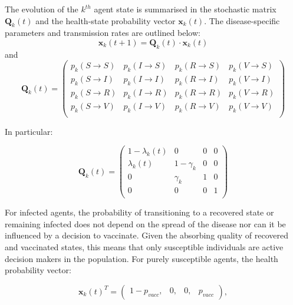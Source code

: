 \documentclass[11pt]{article}
\begin{document}
The evolution of the $\mathit{k}^{th}$ agent state is summarised in the stochastic matrix \(\mathbf{Q}_k(t)\) and the health-state probability vector \(\mathbf{x}_k(t)\). The disease-specific parameters and transmission rates are outlined below:
\begin{equation}\label{eq:1}
	 \mathbf{x}_k(t+1) = \mathbf{Q}_k(t) \cdot \mathbf{x}_k(t)
\end{equation}
and 
\begin{equation}\label{eq:2}
	 \mathbf{Q}_k(t) = 
	 \left (\begin{array}{cccc} p_{k}(S\rightarrow{}S)&p_{k}(I\rightarrow{}S)&p_{k}(R\rightarrow{}S)&p_{k}(V\rightarrow{}S) \\
	 	p_{k}(S\rightarrow{}I)&p_{k}(I\rightarrow{}I)&p_{k}(R\rightarrow{}I)&p_{k}(V\rightarrow{}I) \\
		p_{k}(S\rightarrow{}R)&p_{k}(I\rightarrow{}R)&p_{k}(R\rightarrow{}R)&p_{k}(V\rightarrow{}R) \\
		p_{k}(S\rightarrow{}V)&p_{k}(I\rightarrow{}V)&p_{k}(R\rightarrow{}V)&p_{k}(V\rightarrow{}V) \\
	  \end{array} \right)
\end{equation}

In particular: 

\begin{equation}\label{eq:3}			%
	 \mathbf{Q}_k(t) = 
	 \left (\begin{array}{cccc} 1-\lambda_{k}(t)&0&0&0 \\
	 	\lambda_{k}(t)&1-\gamma_{k}&0&0 \\
		0&\gamma_{k}&1&0 \\
		0&0&0&1 \\
	  \end{array} \right)
\end{equation}

For infected agents, the probability of transitioning to a recovered state or remaining infected does not depend on the spread of the disease nor can it be influenced by a decision to vaccinate. Given the absorbing quality of recovered and vaccinated states, this means that only susceptible individuals are active decision makers in the population. For purely susceptible agents, the health probability vector: 

\begin{equation}\label{eq:4}
	\mathbf{x}_k(t)^T=\left(\begin{array}{cccc} 1-p_{vacc},&0,&0,&p_{vacc}  \end{array} \right),
\end{equation} 
\end{document}

